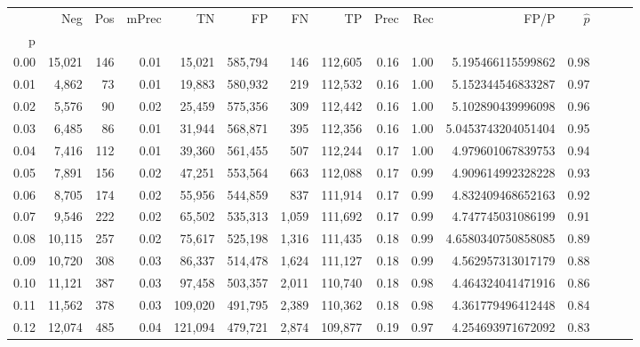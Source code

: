 \begin{tabular}{rrrrrrrrrrrrrrr}
\toprule
{} &     Neg &    Pos & mPrec &       TN &       FP &       FN &       TP &  Prec &   Rec &                  FP/P & $\hat{p}$ \\
p    &         &        &       &          &          &          &          &       &       &                       &           \\
\midrule
0.00 &  15,021 &    146 &  0.01 &   15,021 &  585,794 &      146 &  112,605 &  0.16 &  1.00 &     5.195466115599862 &      0.98 \\
0.01 &   4,862 &     73 &  0.01 &   19,883 &  580,932 &      219 &  112,532 &  0.16 &  1.00 &     5.152344546833287 &      0.97 \\
0.02 &   5,576 &     90 &  0.02 &   25,459 &  575,356 &      309 &  112,442 &  0.16 &  1.00 &     5.102890439996098 &      0.96 \\
0.03 &   6,485 &     86 &  0.01 &   31,944 &  568,871 &      395 &  112,356 &  0.16 &  1.00 &    5.0453743204051404 &      0.95 \\
0.04 &   7,416 &    112 &  0.01 &   39,360 &  561,455 &      507 &  112,244 &  0.17 &  1.00 &     4.979601067839753 &      0.94 \\
0.05 &   7,891 &    156 &  0.02 &   47,251 &  553,564 &      663 &  112,088 &  0.17 &  0.99 &     4.909614992328228 &      0.93 \\
0.06 &   8,705 &    174 &  0.02 &   55,956 &  544,859 &      837 &  111,914 &  0.17 &  0.99 &     4.832409468652163 &      0.92 \\
0.07 &   9,546 &    222 &  0.02 &   65,502 &  535,313 &    1,059 &  111,692 &  0.17 &  0.99 &     4.747745031086199 &      0.91 \\
0.08 &  10,115 &    257 &  0.02 &   75,617 &  525,198 &    1,316 &  111,435 &  0.18 &  0.99 &    4.6580340750858085 &      0.89 \\
0.09 &  10,720 &    308 &  0.03 &   86,337 &  514,478 &    1,624 &  111,127 &  0.18 &  0.99 &     4.562957313017179 &      0.88 \\
0.10 &  11,121 &    387 &  0.03 &   97,458 &  503,357 &    2,011 &  110,740 &  0.18 &  0.98 &     4.464324041471916 &      0.86 \\
0.11 &  11,562 &    378 &  0.03 &  109,020 &  491,795 &    2,389 &  110,362 &  0.18 &  0.98 &     4.361779496412448 &      0.84 \\
0.12 &  12,074 &    485 &  0.04 &  121,094 &  479,721 &    2,874 &  109,877 &  0.19 &  0.97 &     4.254693971672092 &      0.83 \\

\end{tabular}
